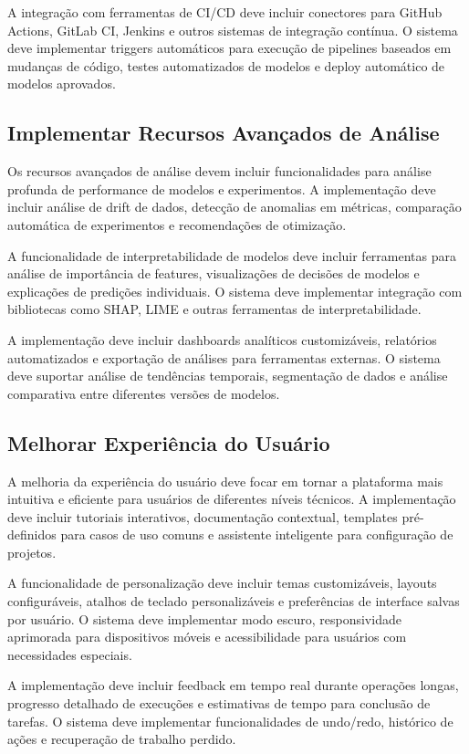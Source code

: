 \documentclass[12pt,a4paper]{article}
\begin{document}
A integração com ferramentas de CI/CD deve incluir conectores para GitHub Actions, GitLab CI, Jenkins e outros sistemas de integração contínua. O sistema deve implementar triggers automáticos para execução de pipelines baseados em mudanças de código, testes automatizados de modelos e deploy automático de modelos aprovados.

\subsection{Implementar Recursos Avançados de Análise}

Os recursos avançados de análise devem incluir funcionalidades para análise profunda de performance de modelos e experimentos. A implementação deve incluir análise de drift de dados, detecção de anomalias em métricas, comparação automática de experimentos e recomendações de otimização.

A funcionalidade de interpretabilidade de modelos deve incluir ferramentas para análise de importância de features, visualizações de decisões de modelos e explicações de predições individuais. O sistema deve implementar integração com bibliotecas como SHAP, LIME e outras ferramentas de interpretabilidade.

A implementação deve incluir dashboards analíticos customizáveis, relatórios automatizados e exportação de análises para ferramentas externas. O sistema deve suportar análise de tendências temporais, segmentação de dados e análise comparativa entre diferentes versões de modelos.

\subsection{Melhorar Experiência do Usuário}

A melhoria da experiência do usuário deve focar em tornar a plataforma mais intuitiva e eficiente para usuários de diferentes níveis técnicos. A implementação deve incluir tutoriais interativos, documentação contextual, templates pré-definidos para casos de uso comuns e assistente inteligente para configuração de projetos.

A funcionalidade de personalização deve incluir temas customizáveis, layouts configuráveis, atalhos de teclado personalizáveis e preferências de interface salvas por usuário. O sistema deve implementar modo escuro, responsividade aprimorada para dispositivos móveis e acessibilidade para usuários com necessidades especiais.

A implementação deve incluir feedback em tempo real durante operações longas, progresso detalhado de execuções e estimativas de tempo para conclusão de tarefas. O sistema deve implementar funcionalidades de undo/redo, histórico de ações e recuperação de trabalho perdido.
\end{document}
